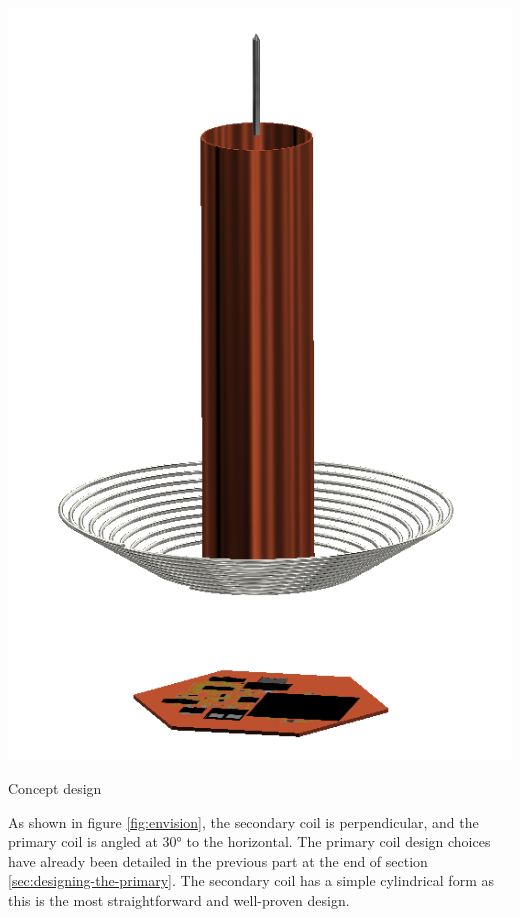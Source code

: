\begin{marginfigure}[1cm]
    \centering
    \includegraphics[width=1.2\textwidth]{kassandra/resources/JerJerWoBistDuKonzept.PNG}
    \caption{Concept design}
    \label{fig:envision}
\end{marginfigure}

As shown in figure \ref{fig:envision}, the secondary coil is perpendicular, and the primary coil is angled at 30° to the horizontal. The primary coil design choices have already been detailed in the previous part at the end of section \ref{sec:designing-the-primary}. The secondary coil has a simple cylindrical form as this is the most straightforward and well-proven design.

